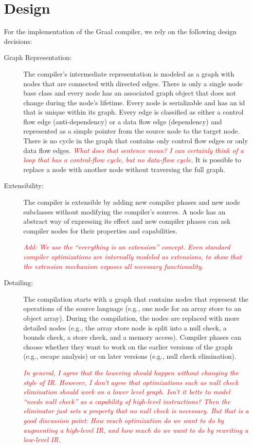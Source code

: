 \documentclass[twocolumn]{svjour3}
\newcommand{\mynote}[2]{
\textcolor{red}{\fbox{\bfseries\sffamily\scriptsize#1}
  {\small\textsf{\emph{#2}}}
\fbox{\bfseries\sffamily\scriptsize }}}
\newcommand\cw[1]{\mynote{CW}{#1}}
\begin{document}
\section{Design}
For the implementation of the Graal compiler, we rely on the following design decisions:
\begin{description}
\item[Graph Representation:]
The compiler's intermediate representation is modeled as a graph with nodes that are connected with directed edges.
There is only a single node base class and every node has an associated graph object that does not change during the node's lifetime.
Every node is serializable and has an id that is unique within its graph.
Every edge is classified as either a control flow edge (anti-dependency) or a data flow edge (dependency) and represented as a simple pointer from the source node to the target node.
There is no cycle in the graph that contains only control flow edges or only data flow edges. \cw{What does that sentence mean?  I can certainly think of a loop that has a control-flow cycle, but no data-flow cycle.}
It is possible to replace a node with another node without traversing the full graph.
\item[Extensibility:]
The compiler is extensible by adding new compiler phases and new node subclasses without modifying the compiler's sources.
A node has an abstract way of expressing its effect and new compiler phases can ask compiler nodes for their properties and capabilities.
\cw{Add: We use the ``everything is an extension'' concept. Even standard compiler optimizations are internally modeled as extensions, to show that the extension mechanism exposes all necessary functionality.}
\item[Detailing:]
The compilation starts with a graph that contains nodes that represent the operations of the source language (e.g., one node for an array store to an object array).
During the compilation, the nodes are replaced with more detailed nodes (e.g., the array store node is split into a null check, a bounds check, a store check, and a memory access).
Compiler phases can choose whether they want to work on the earlier versions of the graph (e.g., escape analysis) or on later versions (e.g., null check elimination).
\cw{In general, I agree that the lowering should happen without changing the style of IR.  However, I don't agree that optimizations such as null check elimination should work on a lower level graph.  Isn't it bette to model ``needs null check'' as a capability of high-level instructions?  Then the eliminator just sets a property that no null check is necessary.  But that is a good discussion point: How much optimization do we want to do by augmenting a high-level IR, and how much do we want to do by rewriting a low-level IR.}

\end{description}
\end{document}
